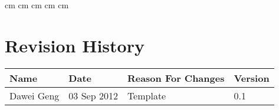 \documentclass[11pt, a4paper]{report}
\begin{document}
 cm
 cm
 cm
 cm
 cm

\tableofcontents






\clearpage
\section*{Revision History}
\begin{tabular}{| l | l | l | l | }
\hline
Name      		&	Date        	&	Reason For Changes                  	  	&	Version     	\\ \hline
Dawei Geng      &	03 Sep 2012     &	Template			                  	  	&	0.1 	    	\\ \hline






\end{tabular}
\clearpage
\end{document}
